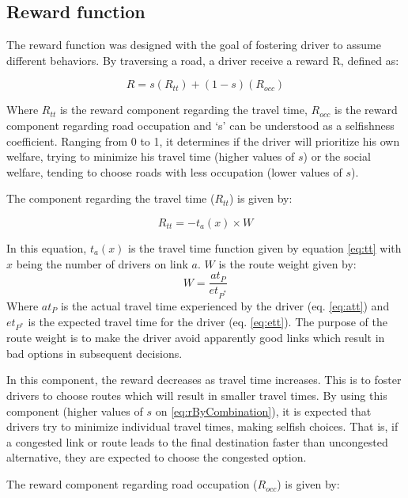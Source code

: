 \documentclass[12pt]{article}
\begin{document}
\subsection{Reward function}
\label{sec:reward}

The reward function was designed with the goal of fostering driver to assume different behaviors. By traversing a road, a driver receive a reward R, defined as:

\begin{equation}
\label{eq:rByCombination}
R = s(R_{tt}) + (1 - s)(R_{occ})
\end{equation}

Where $R_{tt}$ is the reward component regarding the travel time, $R_{occ}$ is the reward component regarding road occupation and `s' can be understood as a selfishness coefficient. Ranging from 0 to 1, it determines if the driver will prioritize his own welfare, trying to minimize his travel time (higher values of $s$) or the social welfare, tending to choose roads with less occupation (lower values of $s$).


The component regarding the travel time ($R_{tt}$) is given by:

\begin{equation}
\label{eq:rByTravelTime}
R_{tt} = - t_a(x) \times W
\end{equation}

In this equation, $t_a(x)$ is the travel time function given by equation \eqref{eq:tt} with $x$ being the number of drivers on link $a$. $W$ is the route weight given by: $$W = \frac{at_P}{et_{P^*}}$$
Where $at_P$ is the actual travel time experienced by the driver (eq. \eqref{eq:att}) and $et_{P^*}$ is the expected travel time for the driver (eq. \eqref{eq:ett}). The purpose of the route weight is to make the driver avoid apparently good links which result in bad options in subsequent decisions.

In this component, the reward decreases as travel time increases. This is to foster drivers to choose routes which will result in smaller travel times. By using this component (higher values of $s$ on \eqref{eq:rByCombination}), it is expected that drivers try to minimize individual travel times, making selfish choices. That is, if a congested link or route leads to the final destination faster than uncongested alternative, they are expected to choose the congested option. 

The reward component regarding road occupation ($R_{occ}$) is given by:
\end{document}
